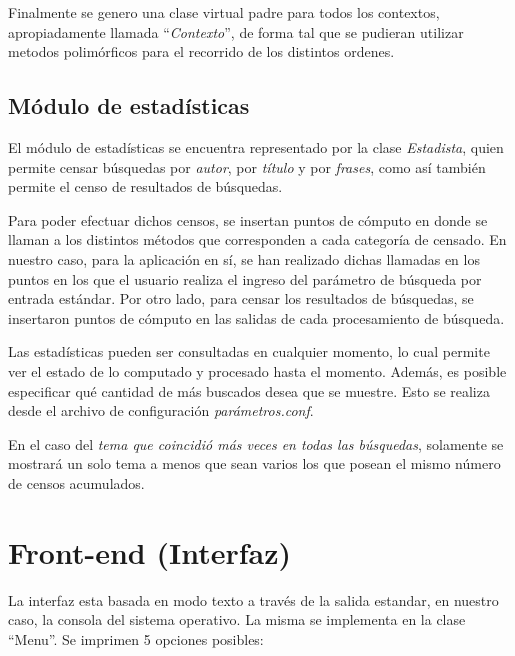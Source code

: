 \documentclass{article}
\begin{document}
	Finalmente se genero una clase virtual padre para todos los contextos, apropiadamente llamada ``\textit{Contexto}'', de forma tal que se pudieran utilizar metodos polimórficos para el recorrido de los distintos ordenes.
\bigskip



\subsection{Módulo de estadísticas}

	El módulo de estadísticas se encuentra representado por la clase \textit{Estadista}, quien permite censar búsquedas por \textit{autor}, por \textit{título} y por \textit{frases}, como así también permite el censo de resultados de búsquedas.
	\par
	Para poder efectuar dichos censos, se insertan
	puntos de cómputo en donde se llaman a los distintos métodos que corresponden a cada categoría de censado. En nuestro caso, para la aplicación en sí, se han realizado dichas llamadas en los puntos en los que el usuario realiza el ingreso del parámetro de búsqueda por entrada estándar. Por otro lado, para censar los resultados de búsquedas, se insertaron puntos de cómputo en las salidas de cada procesamiento de búsqueda.
	\par
	Las estadísticas pueden ser consultadas en cualquier momento, lo cual permite ver el estado de lo computado y procesado hasta el momento. Además, es posible especificar qué cantidad de más buscados desea que se muestre. Esto se realiza desde el archivo de configuración \textit{parámetros.conf}.
	\par
	En el caso del \textit{tema que coincidió más veces en todas las búsquedas}, solamente se mostrará un solo tema a menos que sean varios los que posean el mismo número de censos acumulados.
	\bigskip\bigskip




\section{Front-end (Interfaz)}
\medskip

	La interfaz esta basada en modo texto a través de la salida estandar, en nuestro caso, la consola del sistema operativo. La misma se implementa en la clase ``Menu''. Se imprimen 5 opciones posibles:
\end{document}
